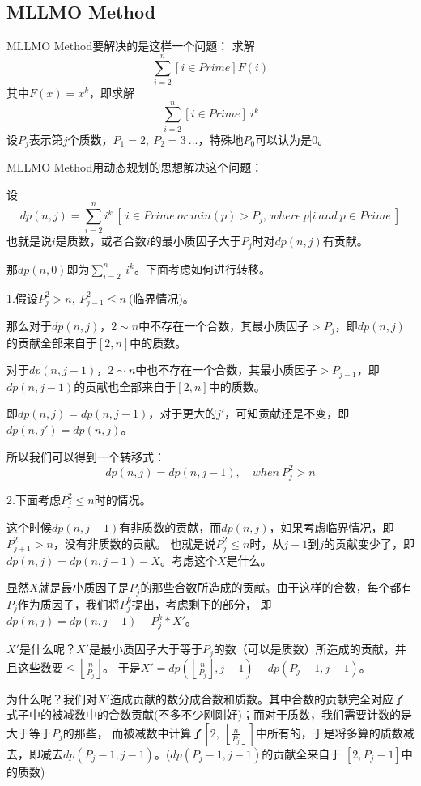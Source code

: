 \subsection{MLLMO Method}
MLLMO Method要解决的是这样一个问题：
求解
$$
\sum_{i=2}^n[i\in Prime]F(i)
$$
其中$F(x) = x^k$，即求解
$$
\sum_{i=2}^n[i\in Prime]\ i^k
$$
设$P_j$表示第$j$个质数，$P_1=2,\ P_2=3\ ...$，特殊地$P_0$可以认为是$0$。

MLLMO Method用动态规划的思想解决这个问题：

设
$$
dp(n,j)=\sum_{i=2}^ni^k\ [\ i\in Prime\ or \ min(p)>P_j,\ where\ p|i\ and\ p\in Prime\ ]
$$
也就是说$i$是质数，或者合数$i$的最小质因子大于$P_j$时对$dp(n,j)$有贡献。

那$dp(n,0)$即为$\sum_{i=2}^n\ i^k$。下面考虑如何进行转移。

{\heiti 1.假设$P_j^2>n,\ P_{j-1}^2\le n\ $(临界情况)。}

那么对于$dp(n,j)$，$2\sim n$中不存在一个合数，其最小质因子$>P_j$，即$dp(n,j)$的贡献全部来自于$[2,n]$中的质数。

对于$dp(n,j-1)$，$2\sim n$中也不存在一个合数，其最小质因子$>P_{j-1}$，即$dp(n,j-1)$的贡献也全部来自于$[2,n]$中的质数。

即$dp(n,j) = dp(n,j-1)$，对于更大的$j'$，可知贡献还是不变，即$dp(n,j') = dp(n,j)$。

所以我们可以得到一个转移式：
$$
dp(n,j) = dp(n,j-1),\quad when\ P_j^2>n
$$

{\heiti 2.下面考虑$P_j^2\le n$时的情况。}

这个时候$dp(n,j-1)$有非质数的贡献，而$dp(n,j)$，如果考虑临界情况，即$P_{j+1}^2>n$，没有非质数的贡献。
也就是说$P_j^2\le n$时，从$j-1$到$j$的贡献变少了，即$dp(n,j) = dp(n,j-1) - X$。考虑这个$X$是什么。

显然$X$就是最小质因子是$P_j$的那些合数所造成的贡献。由于这样的合数，每个都有$P_j$作为质因子，我们将$P_j^k$提出，考虑剩下的部分，
即$dp(n,j) = dp(n,j-1) - P_j^k*X'$。

$X'$是什么呢？$X'$是最小质因子大于等于$P_j$的数（可以是质数）所造成的贡献，并且这些数要$\le \left\lfloor \frac{n}{P_j} \right\rfloor$。 
于是$X' = dp(\left\lfloor \frac{n}{P_j} \right\rfloor,j-1)-dp(P_j-1,j-1)$。

为什么呢？我们对$X'$造成贡献的数分成合数和质数。其中合数的贡献完全对应了式子中的被减数中的合数贡献(不多不少刚刚好)；而对于质数，我们需要计数的是大于等于$P_j$的那些，
而被减数中计算了$[2,\ \left\lfloor \frac{n}{P_j} \right\rfloor]$中所有的，于是将多算的质数减去，即减去$dp(P_j-1,j-1)$。(\quad $dp(P_j-1,j-1)$的贡献全来自于
$[2,P_j-1]$中的质数\quad )


